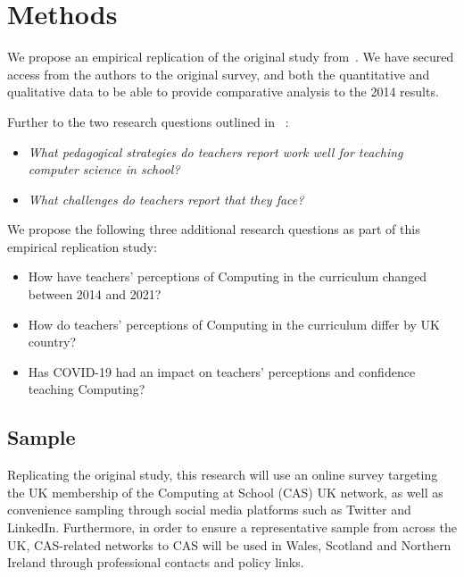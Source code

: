 \documentclass[]{interact}
\theoremstyle{plain}%
\theoremstyle{definition}
\theoremstyle{remark}
\begin{document}
{%
\section{Methods}

We propose an empirical replication of the original study
from~\citet{sentance+csizmadia:2017}. We have secured access from the
authors to the original survey, and both the quantitative and
qualitative data to be able to provide comparative analysis to the
2014 results.

Further to the two research questions outlined in ~\citet{sentance+csizmadia:2017}:

\begin{itemize}
\item {\emph{What pedagogical strategies do teachers report work well for teaching
computer science in school?}}

\item {\emph{What challenges do teachers report that they face?}}
\end{itemize}

We propose the following three additional research questions as part of this
empirical replication study:

\begin{itemize}
\item How have teachers' perceptions of Computing in the curriculum changed
between 2014 and 2021?

\item How do teachers’ perceptions of Computing in the curriculum differ by
UK country?

\item Has COVID-19 had an impact on teachers’ perceptions and confidence
teaching Computing?
\end{itemize}

\subsection{Sample}

Replicating the original study, this research will use an online
survey targeting the UK membership of the Computing at School (CAS) UK
network, as well as convenience sampling through social media
platforms such as Twitter and LinkedIn. Furthermore, in order to
ensure a representative sample from across the UK, CAS-related
networks to CAS will be used in Wales, Scotland and Northern Ireland
through professional contacts and policy links.

}
\end{document}
